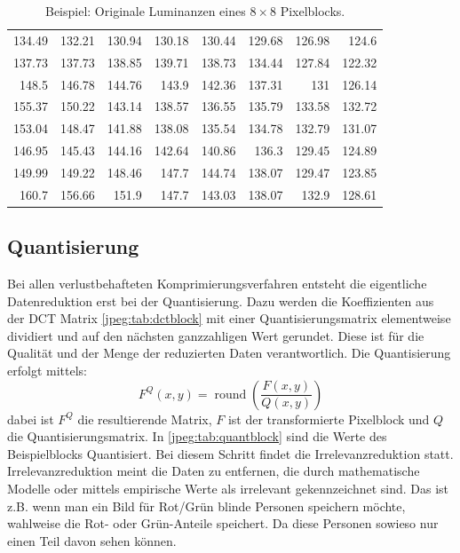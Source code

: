 \begin{table}[b]
    \centering
    \begin{tabular}{*{8}{r}}
        134.49 & 132.21 & 130.94 & 130.18 & 130.44 & 129.68 & 126.98 & 124.6\phantom{0}  \\
        137.73 & 137.73 & 138.85 & 139.71 & 138.73 & 134.44 & 127.84 & 122.32 \\
        148.5\phantom{0}  & 146.78 & 144.76 & 143.9\phantom{0}  & 142.36 & 137.31 & 131\phantom{.00}    & 126.14 \\
        155.37 & 150.22 & 143.14 & 138.57 & 136.55 & 135.79 & 133.58 & 132.72 \\
        153.04 & 148.47 & 141.88 & 138.08 & 135.54 & 134.78 & 132.79 & 131.07 \\
        146.95 & 145.43 & 144.16 & 142.64 & 140.86 & 136.3\phantom{0}  & 129.45 & 124.89 \\
        149.99 & 149.22 & 148.46 & 147.7\phantom{0}  & 144.74 & 138.07 & 129.47 & 123.85 \\
        160.7\phantom{0}  & 156.66 & 151.9\phantom{0}  & 147.7\phantom{0}  & 143.03 & 138.07 & 132.9\phantom{0}  & 128.61
    \end{tabular}
    \caption{Beispiel: Originale Luminanzen eines \(8\times8\) Pixelblocks.
        \label{jpeg:tab:orgblock}}
\end{table}

\subsection{Quantisierung
\label{jpeg:subsection:quantisierung}}
Bei allen verlustbehafteten Komprimierungsverfahren entsteht die eigentliche Datenreduktion erst bei der Quantisierung.
Dazu werden die Koeffizienten aus der DCT Matrix \ref{jpeg:tab:dctblock} mit einer Quantisierungsmatrix elementweise dividiert und auf den nächsten ganzzahligen Wert gerundet.
Diese ist für die Qualität und der Menge der reduzierten Daten verantwortlich.
Die Quantisierung erfolgt mittels: 
\begin{equation}
    F^Q(x,y)
    =
    \operatorname{round} \left(
    \frac{F(x,y)}{Q(x,y)}
    \right)
\end{equation}
dabei ist \(F^Q\) die resultierende Matrix, \(F\) ist der transformierte Pixelblock und \(Q\) die Quantisierungsmatrix.
In \ref{jpeg:tab:quantblock} sind die Werte des Beispielblocks Quantisiert.
Bei diesem Schritt findet die Irrelevanzreduktion statt.
Irrelevanzreduktion meint die Daten zu entfernen, die durch mathematische Modelle oder mittels empirische Werte als irrelevant gekennzeichnet sind.
Das ist z.B. wenn man ein Bild für Rot/Grün blinde Personen speichern möchte, wahlweise die Rot- oder Grün-Anteile speichert.
Da diese Personen sowieso nur einen Teil davon sehen können.

